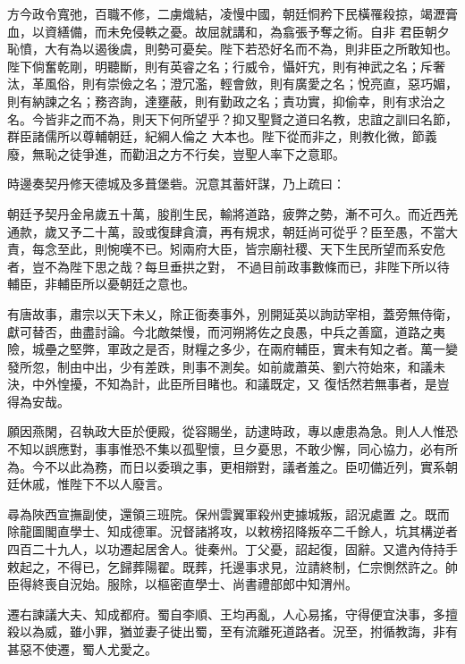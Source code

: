 \begin{pinyinscope}
 方今政令寬弛，百職不修，二虜熾結，凌慢中國，朝廷恫矜下民橫罹殺掠，竭瀝膏血，以資繕備，而未免侵軼之憂。故屈就講和，為翕張予奪之術。自非
 君臣朝夕恥憤，大有為以遏後虞，則勢可憂矣。陛下若恐好名而不為，則非臣之所敢知也。陛下倘奮乾剛，明聽斷，則有英睿之名；行威令，懾奸宄，則有神武之名；斥奢汰，革風俗，則有崇儉之名；澄冗濫，輕會斂，則有廣愛之名；悅亮直，惡巧媚，則有納諫之名；務咨詢，達壅蔽，則有勤政之名；責功實，抑偷幸，則有求治之名。今皆非之而不為，則天下何所望乎？抑又聖賢之道曰名教，忠誼之訓曰名節，群臣諸儒所以尊輔朝廷，紀綱人倫之
 大本也。陛下從而非之，則教化微，節義廢，無恥之徒爭進，而勸沮之方不行矣，豈聖人率下之意耶。



 時邊奏契丹修天德城及多葺堡砦。況意其蓄奸謀，乃上疏曰：



 朝廷予契丹金帛歲五十萬，朘削生民，輸將道路，疲弊之勢，漸不可久。而近西羌通款，歲又予二十萬，設或復肆貪瀆，再有規求，朝廷尚可從乎？臣至愚，不當大責，每念至此，則惋嘆不已。矧兩府大臣，皆宗廟社稷、天下生民所望而系安危者，豈不為陛下思之哉？每旦垂拱之對，
 不過目前政事數條而已，非陛下所以待輔臣，非輔臣所以憂朝廷之意也。



 有唐故事，肅宗以天下未乂，除正衙奏事外，別開延英以詢訪宰相，蓋旁無侍衛，獻可替否，曲盡討論。今北敵桀慢，而河朔將佐之良愚，中兵之善窳，道路之夷險，城壘之堅弊，軍政之是否，財糧之多少，在兩府輔臣，實未有知之者。萬一變發所忽，制由中出，少有差跌，則事不測矣。如前歲蕭英、劉六符始來，和議未決，中外惶擾，不知為計，此臣所目睹也。和議既定，又
 復恬然若無事者，是豈得為安哉。



 願因燕閑，召執政大臣於便殿，從容賜坐，訪逮時政，專以慮患為急。則人人惟恐不知以誤應對，事事惟恐不集以孤聖懷，旦夕憂思，不敢少懈，同心協力，必有所為。今不以此為務，而日以委瑣之事，更相辯對，議者羞之。臣叨備近列，實系朝廷休戚，惟陛下不以人廢言。



 尋為陜西宣撫副使，還領三班院。保州雲翼軍殺州吏據城叛，詔況處置
 之。既而除龍圖閣直學士、知成德軍。況督諸將攻，以敕榜招降叛卒二千餘人，坑其構逆者四百二十九人，以功遷起居舍人。徙秦州。丁父憂，詔起復，固辭。又遣內侍持手敕起之，不得已，乞歸葬陽翟。既葬，托邊事求見，泣請終制，仁宗惻然許之。帥臣得終喪自況始。服除，以樞密直學士、尚書禮部郎中知渭州。



 遷右諫議大夫、知成都府。蜀自李順、王均再亂，人心易搖，守得便宜決事，多擅殺以為威，雖小罪，猶並妻子徙出蜀，至有流離死道路者。況至，拊循教誨，非有甚惡不使遷，蜀人尤愛之。




\end{pinyinscope}
